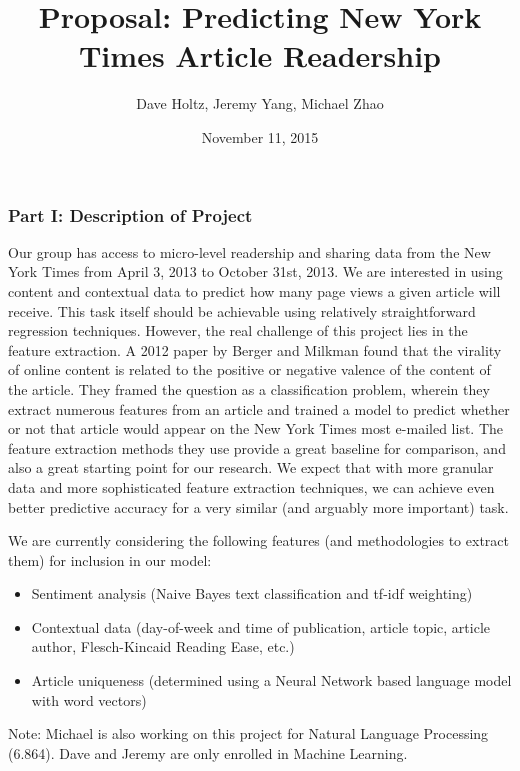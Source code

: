 \documentclass[10pt]{article}
\begin{document}
	\title{Proposal: Predicting New  York Times Article Readership}
	\date{November 11, 2015}
	\author{Dave Holtz, Jeremy Yang, Michael Zhao}
	\maketitle
	
\subsubsection*{Part I: Description of Project}

Our group has access to micro-level readership and sharing data from the New York Times from April 3, 2013 to October 31st, 2013. We are interested in using content and contextual data to predict how many page views a given article will receive. This task itself should be achievable using relatively straightforward regression techniques. However, the real challenge of this project lies in the feature extraction. A 2012 paper by Berger and Milkman \cite{berger} found that the virality of online content is related to the positive or negative valence of the content of the article. They framed the question as a classification problem, wherein they extract numerous features from an article and trained a model to predict whether or not that article would appear on the New York Times most e-mailed list. The feature extraction methods they use provide a great baseline for comparison, and also a great starting point for our research. We expect that with more granular data and more sophisticated feature extraction techniques, we can achieve even better predictive accuracy for a very similar (and arguably more important) task.

We are currently considering the following features (and methodologies to extract them) for inclusion in our model:
\begin{itemize}
\item Sentiment analysis (Naive Bayes text classification and tf-idf weighting)
\item Contextual data (day-of-week and time of publication, article topic, article author, Flesch-Kincaid Reading Ease, etc.)
\item Article uniqueness (determined using a Neural Network based language model with word vectors)
\end{itemize}

Note: Michael is also working on this project for Natural Language Processing (6.864). Dave and Jeremy are only enrolled in Machine Learning.
\end{document}
